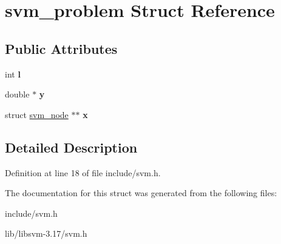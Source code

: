 \hypertarget{structsvm__problem}{
\section{svm\_\-problem Struct Reference}
\label{structsvm__problem}
}
\subsection*{Public Attributes}
\begin{DoxyCompactItemize}
\item 
\hypertarget{structsvm__problem_a4350eb6820f0d6126bffb6264cec65b3}{
int {\bfseries l}}
\label{structsvm__problem_a4350eb6820f0d6126bffb6264cec65b3}

\item 
\hypertarget{structsvm__problem_ac33878b46c423764631363e5d0b33dfe}{
double $\ast$ {\bfseries y}}
\label{structsvm__problem_ac33878b46c423764631363e5d0b33dfe}

\item 
\hypertarget{structsvm__problem_a78e5cd2c3855e413b432db45f1a5d411}{
struct \hyperlink{structsvm__node}{svm\_\-node} $\ast$$\ast$ {\bfseries x}}
\label{structsvm__problem_a78e5cd2c3855e413b432db45f1a5d411}

\end{DoxyCompactItemize}


\subsection{Detailed Description}


Definition at line 18 of file include/svm.h.



The documentation for this struct was generated from the following files:\begin{DoxyCompactItemize}
\item 
include/svm.h\item 
lib/libsvm-\/3.17/svm.h\end{DoxyCompactItemize}

